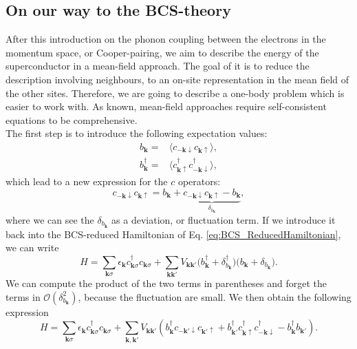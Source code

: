 \documentclass[../main.tex]{subfile}
\begin{document}
\subsection{On our way to the BCS-theory}
After this introduction on the phonon coupling between the electrons in the momentum space, or Cooper-pairing,
we aim to describe the energy of the superconductor in a mean-field approach. The goal of it is to reduce the description
involving neighbours, to an on-site representation in the mean field of the other sites. Therefore, we are going to describe 
a one-body problem which is easier to work with. As known, mean-field approaches require self-consistent equations to be comprehensive.\\

The first step is to introduce the following expectation values:
\begin{align}
    b_{\bm{k}} = &\langle c_{-\bm{k}\downarrow}c_{\bm{k}\uparrow}\rangle, \label{eq:ExpectBCS} \\
    b_{\bm{k}}^{\dagger} = &\langle c_{\bm{k}\uparrow}^{\dagger}c_{-\bm{k}\downarrow}^{\dagger}\rangle,  \label{eq:ExpectBCSDag}
\end{align}
which lead to a new expression for the $c$ operators:
\begin{equation}
    c_{-\bm{k}\downarrow}c_{\bm{k}\uparrow} = b_{\bm{k}} + \underbrace{c_{-\bm{k}\downarrow}c_{\bm{k}\uparrow} - b_{\bm{k}}}_{\delta_{b_{\bm{k}}}},
\end{equation}
where we can see the $\delta_{b_{\bm{k}}}$ as a deviation, or fluctuation term. If we introduce it back into the BCS-reduced Hamiltonian of Eq. \ref{eq:BCS_ReducedHamiltonian},
we can write
\[
    H = \sum_{\bm{k}\sigma} \epsilon_{\bm{k}} c_{\bm{k}\sigma}^{\dagger}c_{\bm{k}\sigma} + \sum_{\bm{k}\bm{k}'} V_{\bm{k}\bm{k}'} \bigl( b_{\bm{k}}^{\dagger} + \delta_{b_{\bm{k}}}^{\dagger}\bigr)\bigl( b_{\bm{k}} + \delta_{b_{\bm{k}}}\bigr).
\]
We can compute the product of the two terms in parentheses and forget the terms in $\mathcal{O}\left(\delta_{b_{\bm{k}}}^2\right)$, because the fluctuation are small.
We then obtain the following expression
\[
    H = \sum_{\bm{k}\sigma} \epsilon_{\bm{k}} c_{\bm{k}\sigma}^{\dagger}c_{\bm{k}\sigma} + \sum_{\bm{k},\bm{k}'} V_{\bm{k}\bm{k}'} \left( b_{\bm{k}}^{\dagger}c_{-\bm{k}'\downarrow}c_{\bm{k}'\uparrow}  + b_{\bm{k}'}^{\dagger} c_{\bm{k}\uparrow} ^{\dagger}c_{-\bm{k}\downarrow}^{\dagger} -  b_{\bm{k}}^{\dagger} b_{\bm{k}'}\right).
\]
\end{document}
